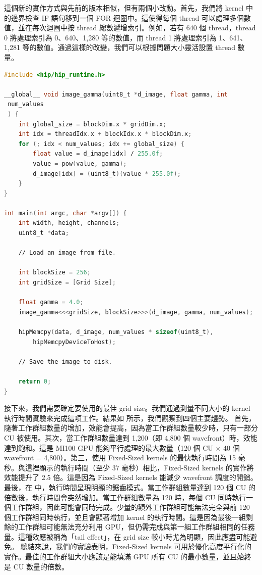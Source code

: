 這個新的實作方式與先前的版本相似，但有兩個小改動。首先，我們將 kernel 中的邊界檢查 IF 語句移到一個 FOR 迴圈中。這使得每個 thread 可以處理多個數值，並在每次迴圈中按 thread 總數遞增索引。例如，若有 640 個 thread，thread 0 將處理索引為 0、640、1,280 等的數值，而 thread 1 將處理索引為 1、641、1,281 等的數值。通過這樣的改變，我們可以根據問題大小靈活設置 thread 數量。

\begin{lstlisting}[language=C, caption={使用Fixed-Sized kernels 的影像伽瑪校正 GPU 實作： kernel 以預定義的大小啟動，每個 thread 負責處理影像中的多個像素。}, captionpos=t, label={lst:FixedSize}]
#include <hip∕hip_runtime.h>

__global__ void image_gamma(uint8_t *d_image, float gamma, int 
 num_values
 ) {
    int global_size = blockDim.x * gridDim.x;
    int idx = threadIdx.x + blockIdx.x * blockDim.x;
    for (; idx < num_values; idx += global_size) {
        float value = d_image[idx] ∕ 255.0f;
        value = pow(value, gamma);
        d_image[idx] = (uint8_t)(value * 255.0f);
    }
}

int main(int argc, char *argv[]) {
    int width, height, channels;
    uint8_t *data;

    ∕∕ Load an image from file.

    int blockSize = 256;
    int gridSize = [Grid Size];

    float gamma = 4.0;
    image_gamma<<<gridSize, blockSize>>>(d_image, gamma, num_values);

    hipMemcpy(data, d_image, num_values * sizeof(uint8_t),
        hipMemcpyDeviceToHost);

    ∕∕ Save the image to disk.

    return 0;
}
\end{lstlisting}

接下來，我們需要確定要使用的最佳 grid size。我們通過測量不同大小的 kernel 執行時間實驗來完成這項工作。結果如  所示，我們觀察到四個主要趨勢。
首先，隨著工作群組數量的增加，效能會提高，因為當工作群組數量較少時，只有一部分CU 被使用。其次，當工作群組數量達到 1,200（即 4,800 個 wavefront）時，效能達到飽和。這是 MI100 GPU 能夠平行處理的最大數量（120 個 CU × 40 個 wavefront = 4,800）。第三，使用 Fixed-Sized kernels 的最快執行時間為 15 毫秒。與這裡顯示的執行時間（至少 37 毫秒）相比，Fixed-Sized kernels 的實作將效能提升了 2.5 倍。這是因為 Fixed-Sized kernels 能減少 wavefront 調度的開銷。
最後，在  中，執行時間呈現明顯的鋸齒模式。當工作群組數量達到 120 個 CU 的倍數後，執行時間會突然增加。當工作群組數量為 120 時，每個 CU 同時執行一個工作群組，因此可能會同時完成。少量的額外工作群組可能無法完全與前 120 個工作群組同時執行，並且會顯著增加 kernel 的執行時間。這是因為最後一組剩餘的工作群組可能無法充分利用 GPU，但仍需完成與第一組工作群組相同的任務量。這種效應被稱為「tail effect」，在 grid size 較小時尤為明顯，因此應盡可能避免。
總結來說，我們的實驗表明，Fixed-Sized kernels 可用於優化高度平行化的實作。最佳的工作群組大小應該是能填滿 GPU 所有 CU 的最小數量，並且始終是 CU 數量的倍數。

